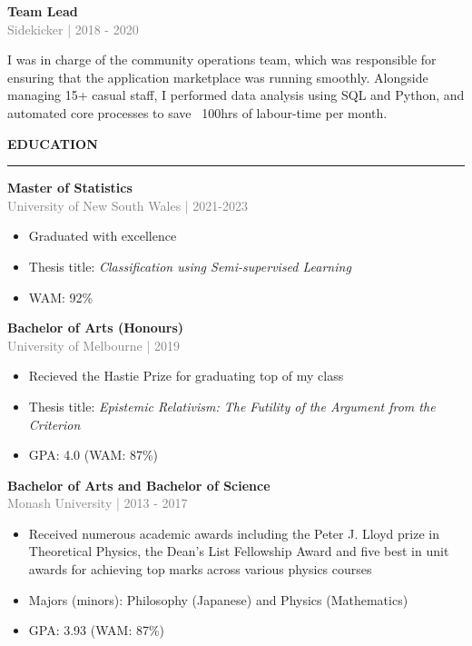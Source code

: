 \documentclass[10pt]{article}
\begin{document}
\vspace{0.5cm}
{\bf Team Lead} \\
\textcolor{gray}{Sidekicker | 2018 - 2020} \\[3pt]
\begin{small}
 I was in charge of the community operations team,  which was responsible for ensuring that the application marketplace was running smoothly. 
 Alongside managing 15+ casual staff, I performed data analysis using SQL and Python, and automated core processes to save ~100hrs of labour-time per month.
\end{small}


\vspace{1cm}
\begin{large}
{\bf EDUCATION} \\
\textcolor{gray}{\rule{2cm}{2mm}}
\end{large}
\vspace{5pt}

{\bf Master of Statistics} \\
\textcolor{gray}{University of New South Wales | 2021-2023}
\begin{small}
\begin{itemize}
  \item Graduated with excellence
  \item Thesis title: \textit{Classification using Semi-supervised Learning}
  \item WAM: 92\%
\end{itemize}
\end{small}

\vspace{0.5cm}
{\bf Bachelor of Arts (Honours)} \\
\textcolor{gray}{University of Melbourne | 2019}
\begin{small}
\begin{itemize}
  \item Recieved the Hastie Prize for graduating top of my class
  \item Thesis title: \textit{Epistemic Relativism: The Futility of the Argument from the Criterion}
  \item GPA: 4.0 (WAM: 87\%)
\end{itemize}
\end{small}

\vspace{0.5cm}
{\bf Bachelor of Arts and Bachelor of Science} \\
\textcolor{gray}{Monash University | 2013 - 2017}
\begin{small}
\begin{itemize}
  \item Received numerous academic awards including the Peter J. Lloyd prize in Theoretical Physics, 
    the Dean's List Fellowship Award and five best in unit awards for achieving top marks across various physics courses
  \item Majors (minors): Philosophy (Japanese) and Physics (Mathematics)
  \item GPA: 3.93 (WAM: 87\%)
\end{itemize}
\end{small}
\end{document}
